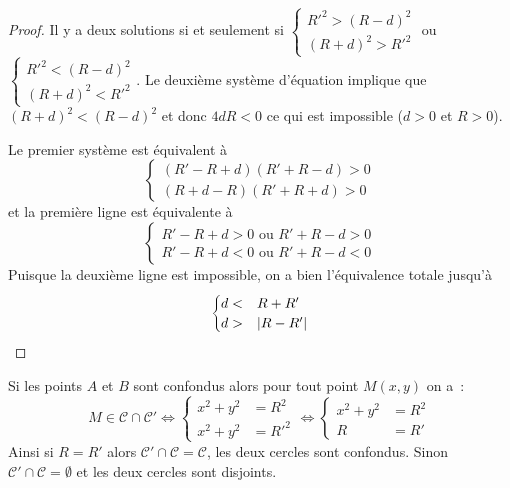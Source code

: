 \begin{proof}
    Il y a deux solutions si et seulement si \(\begin{cases}R'^2 > (R - d)^2 \\ (R 
        + d)^2>R'^2\end{cases}\) ou \(\begin{cases}R'^2 < (R - d)^2 \\ (R + 
    d)^2<R'^2\end{cases}\).
    Le deuxième système d'équation implique que \((R + d)^2<(R - d)^2\) et donc 
    \(4dR<0\) ce qui est impossible (\(d>0\) et \(R>0\)).

    Le premier système est équivalent à 
    \begin{equation*}
        \begin{cases}        
            (R'-R + d)(R' + R - d) > 0 \\ 
            (R + d - R)(R' + R + d)>0
        \end{cases}
    \end{equation*}
    et la première ligne est équivalente à 
    \begin{equation*}
        \begin{cases}
            R' - R + d>0 \text{~ou~} R' + R -d> 0 \\ 
            R'-R + d<0 \text{~ou~} R' + R - d<0
        \end{cases}
    \end{equation*}
    Puisque la deuxième ligne est impossible, on a bien l'équivalence totale jusqu'à
    \begin{equation*}
        \begin{cases}
            d <& R + R' \\
            d>&\left\lvert R - R'\right\rvert
        \end{cases}
    \end{equation*}
\end{proof}

Si les points \(A\) et \(B\) sont confondus alors pour tout point \(M(x , y)\) on 
a~:
\begin{equation}
    M \in \mathcal{C} \cap \mathcal{C}' \iff 
    \begin{cases} x^2 + y^2 & = R^2 \\ x^2 + y^2& = R'^2 \end{cases} \iff 
    \begin{cases} x^2 + y^2 & = R^2 \\ R& = R' \end{cases}
\end{equation}
Ainsi si \(R = R'\) alors \(\mathcal{C}' \cap \mathcal{C} = \mathcal{C}\), les 
deux cercles sont confondus. Sinon \(\mathcal{C}' \cap \mathcal{C} = \emptyset\) 
et les deux cercles sont disjoints.

